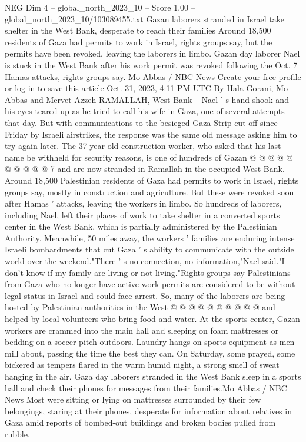 \begin{textsample}{NEG Dim 4 – global\_north\_2023\_10 – Score 1.00 – global\_north\_2023\_10/103089455.txt}  \label{ex:f4_neg_010}
Gazan laborers stranded in Israel take shelter in the West Bank, desperate to reach their families Around 18,500 residents of Gaza had permits to work in Israel, rights groups say, but the permits have been revoked, leaving the laborers in limbo.
Gazan day laborer Nael is stuck in the West Bank after his work permit was revoked following the Oct. 7 Hamas attacks, rights groups say.
Mo Abbas / NBC News Create your free profile or log in to save this article Oct. 31, 2023, 4:11 PM UTC By Hala Gorani, Mo Abbas and Mervet Azzeh RAMALLAH, West Bank -- Nael ' s hand shook and his eyes teared up as he tried to call his wife in Gaza, one of several attempts that day.
But with communications to the besieged Gaza Strip cut off since Friday by Israeli airstrikes, the response was the same old message asking him to try again later.
The 37-year-old construction worker, who asked that his last name be withheld for security reasons, is one of hundreds of Gazan @ @ @ @ @ @ @ @ @ @ 7 and are now stranded in Ramallah in the occupied West Bank.
Around 18,500 Palestinian residents of Gaza had permits to work in Israel, rights groups say, mostly in construction and agriculture.
But these were revoked soon after Hamas ' attacks, leaving the workers in limbo.
So hundreds of laborers, including Nael, left their places of work to take shelter in a converted sports center in the West Bank, which is partially administered by the Palestinian Authority.
Meanwhile, 50 miles away, the workers ' families are enduring intense Israeli bombardments that cut Gaza ' s ability to communicate with the outside world over the weekend."There ' s no connection, no information,"Nael said."I don't know if my family are living or not living."Rights groups say Palestinians from Gaza who no longer have active work permits are considered to be without legal status in Israel and could face arrest.
So, many of the laborers are being hosted by Palestinian authorities in the West @ @ @ @ @ @ @ @ @ @ and helped by local volunteers who bring food and water.
At the sports center, Gazan workers are crammed into the main hall and sleeping on foam mattresses or bedding on a soccer pitch outdoors.
Laundry hangs on sports equipment as men mill about, passing the time the best they can.
On Saturday, some prayed, some bickered as tempers flared in the warm humid night, a strong smell of sweat hanging in the air.
Gaza day laborers stranded in the West Bank sleep in a sports hall and check their phones for messages from their families.Mo Abbas / NBC News Most were sitting or lying on mattresses surrounded by their few belongings, staring at their phones, desperate for information about relatives in Gaza amid reports of bombed-out buildings and broken bodies pulled from rubble.

\end{textsample}

